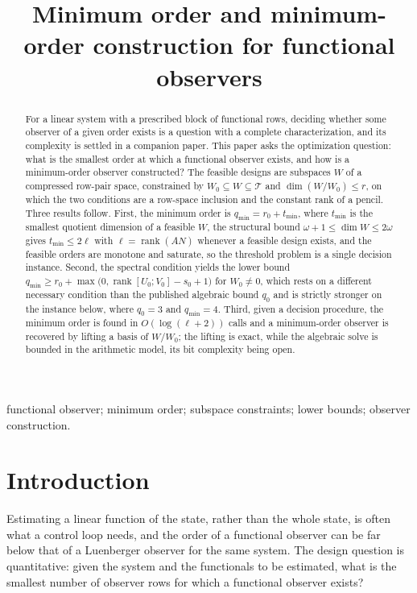 ﻿\documentclass[journal]{IEEEtran}
\theoremstyle{plainn}
\theoremstyle{remark}
\begin{document}
\title{Minimum order and minimum-order construction for functional observers}
\author{}
\maketitle

\begin{abstract}
For a linear system with a prescribed block of functional rows, deciding whether some observer of a
given order exists is a question with a complete characterization, and its complexity is settled in a
companion paper. This paper asks the optimization question: what is the smallest order at which a
functional observer exists, and how is a minimum-order observer constructed? The feasible designs are
subspaces $W$ of a compressed row-pair space, constrained by $W_0\subseteq W\subseteq\mathcal T$ and
$\dim(W/W_0)\le r$, on which the two conditions are a row-space inclusion and the constant rank of a
pencil. Three results follow. First, the minimum order is $q_{\min}=r_0+t_{\min}$, where $t_{\min}$ is
the smallest quotient dimension of a feasible $W$, the structural bound $\omega+1\le\dim W\le2\omega$
gives $t_{\min}\le2\ell$ with $\ell=\operatorname{rank}(AN)$ whenever a feasible design exists, and the feasible orders are monotone and
saturate, so the threshold problem is a single decision instance. Second, the spectral condition yields
the lower bound $q_{\min}\ge r_0+\max\bigl(0,\operatorname{rank}[U_0;V_0]-s_0+1\bigr)$ for $W_0\neq0$, which rests on
a different necessary condition than the published algebraic bound $q_0$ and is strictly stronger on the
instance below, where $q_0=3$ and $q_{\min}=4$. Third, given a decision procedure, the minimum order is
found in $O(\log(\ell+2))$ calls and a minimum-order observer is recovered by lifting a basis of
$W/W_0$; the lifting is exact, while the algebraic solve is bounded in the arithmetic model, its bit
complexity being open.
\end{abstract}

\begin{IEEEkeywords}
functional observer; minimum order; subspace constraints; lower bounds; observer construction.
\end{IEEEkeywords}

\section{Introduction}\label{sec:intro}

Estimating a linear function of the state, rather than the whole state, is often what a control loop
needs, and the order of a functional observer can be far below that of a Luenberger observer for the
same system. The design question is quantitative: given the system and the functionals to be
estimated, what is the smallest number of observer rows for which a functional observer exists?
\end{document}
